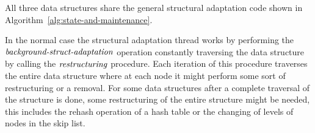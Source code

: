 % 
% 
% 
% 
% 
% 
% 
% 
% 
% 
% 
% 

All three data structures share the general structural adaptation code shown in Algorithm~\ref{alg:state-and-maintenance}.

In the normal case the structural adaptation thread works by performing the
$\ms{background-struct-adaptation}$ operation constantly traversing the data structure
by calling the $\ms{restructuring}$ procedure.
Each iteration of this procedure traverses the entire data structure where at each node it might perform some sort of restructuring or a removal.
For some data structures after a complete traversal of the structure is done, some restructuring of the entire structure might be needed,
this includes the rehash operation of a hash table or the changing of levels of nodes in the skip list.

